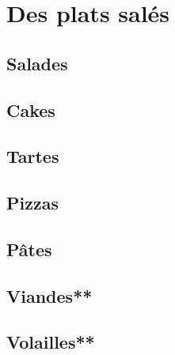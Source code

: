 \documentclass[A4paper,twoside, 12pt]{book}
\begin{document}
\frontmatter
\tableofcontents 		%
\mainmatter

\part{Des plats salés}
	\chapter{Salades}
\begin{minipage}{10cm}
\minitoc
\end{minipage}



		
	\chapter{Cakes}



	
	
	\chapter{Tartes}


	


	\chapter{Pizzas}
	\chapter{Pâtes}
	
	\chapter{Viandes**}






	\chapter{Volailles**}






	
\end{document}
